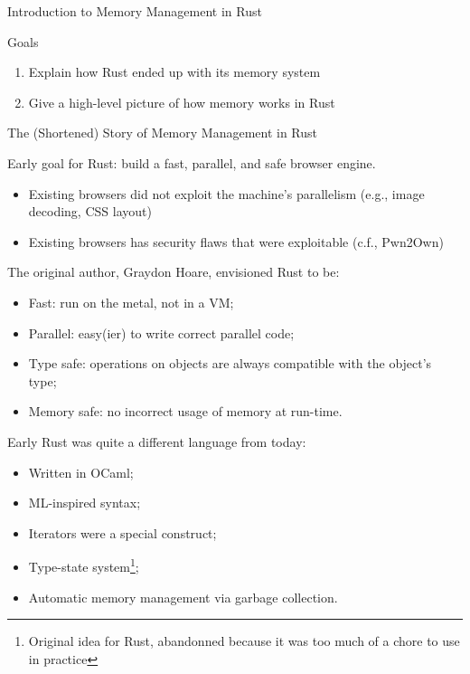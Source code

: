 \documentclass[9pt]{beamer}
\renewcommand\big[1]{
  \begin{center}
    \Large{#1}
  \end{center}
}
\begin{document}
\begin{frame}
  \centering\Huge{Introduction to Memory Management in Rust}
\end{frame}

\begin{frame}
  \big{Goals}

  \begin{enumerate}
    \item Explain how Rust ended up with its memory system
    \item Give a high-level picture of how memory works in Rust
  \end{enumerate}
\end{frame}

\begin{frame}
  \centering\Huge{The (Shortened) Story of Memory Management in Rust}
\end{frame}

\begin{frame}
  \big{Early goal for Rust: build a fast, parallel, and safe browser engine.}

  \begin{itemize}
    \item Existing browsers did not exploit the machine's parallelism (e.g., image decoding, CSS layout)
    \item Existing browsers has security flaws that were exploitable (c.f., Pwn2Own)
  \end{itemize}
\end{frame}

\begin{frame}
  \big{The original author, Graydon Hoare, envisioned Rust to be:}

  \begin{itemize}
    \item Fast: run on the metal, not in a VM;
    \item Parallel: easy(ier) to write correct parallel code;
    \item Type safe: operations on objects are always compatible with the object's type;
    \item Memory safe: no incorrect usage of memory at run-time.
  \end{itemize}
\end{frame}

\begin{frame}
  \big{Early Rust was quite a different language from today:}

  \begin{itemize}
    \item Written in OCaml;
    \item ML-inspired syntax;
    \item Iterators were a special construct;
    \item Type-state system\footnote{Original idea for Rust, abandonned because it was too much of a chore to use in practice};
    \item Automatic memory management via garbage collection.
  \end{itemize}
\end{frame}
\end{document}
